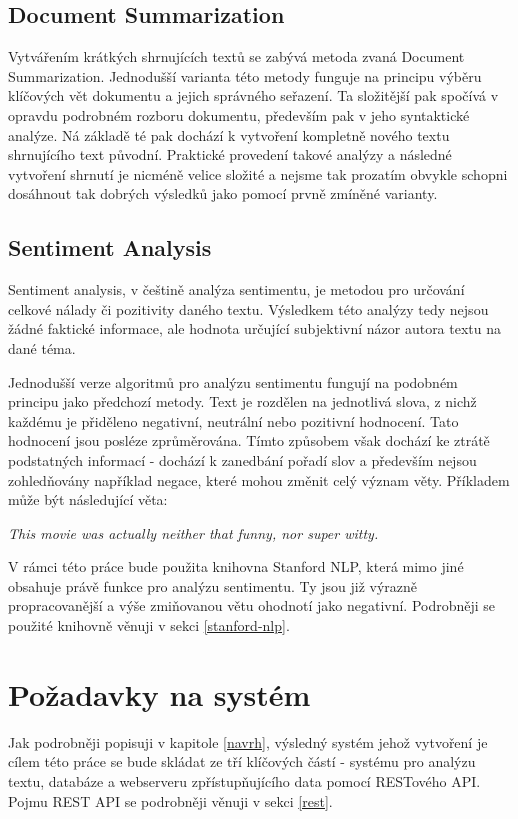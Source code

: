 \documentclass[thesis=B,czech]{FITthesis}[2012/06/26]
\begin{document}
\subsection{Document Summarization}
	Vytvářením krátkých shrnujících textů se zabývá metoda zvaná Document Summarization. Jednodušší varianta této metody funguje na principu výběru klíčových vět dokumentu a jejich správného seřazení. Ta složitější pak spočívá v opravdu podrobném rozboru dokumentu, především pak v jeho syntaktické analýze. Ná základě té pak dochází k vytvoření kompletně nového textu shrnujícího text původní. Praktické provedení takové analýzy a následné vytvoření shrnutí je nicméně velice složité a nejsme tak prozatím obvykle schopni dosáhnout tak dobrých výsledků jako pomocí prvně zmíněné varianty\cite{aaaa}. 


\subsection{Sentiment Analysis}
\label{sentiment-analysis}
	Sentiment analysis, v češtině analýza sentimentu, je metodou pro určování celkové nálady či pozitivity daného textu. Výsledkem této analýzy tedy nejsou žádné faktické informace, ale hodnota určující subjektivní názor autora textu na dané téma. 
	
	Jednodušší verze algoritmů pro analýzu sentimentu fungují na podobném principu jako předchozí metody. Text je rozdělen na jednotlivá slova, z nichž každému je přiděleno negativní, neutrální nebo pozitivní hodnocení. Tato hodnocení jsou posléze zprůměrována. Tímto způsobem však dochází ke ztrátě podstatných informací - dochází k zanedbání pořadí slov a především nejsou zohledňovány například negace, které mohou změnit celý význam věty. Příkladem může být následující věta:

\vspace{\baselineskip}
\textit{This movie was actually neither that funny, nor super witty.}	
\vspace{\baselineskip}

	V rámci této práce bude použita knihovna Stanford NLP\cite{sssss}, která mimo jiné obsahuje právě funkce pro analýzu sentimentu. Ty jsou již výrazně propracovanější a výše zmiňovanou větu ohodnotí jako negativní. Podrobněji se použité knihovně věnuji v sekci \ref{stanford-nlp}.


\section{Požadavky na systém}
\label{pozadavky}
	Jak podrobněji popisuji v kapitole \ref{navrh}, výsledný systém jehož vytvoření je cílem této práce se bude skládat ze tří klíčových částí - systému pro analýzu textu, databáze a webserveru zpřístupňujícího data pomocí RESTového API. Pojmu REST API se podrobněji věnuji v sekci \ref{rest}. 
	
\end{document}
